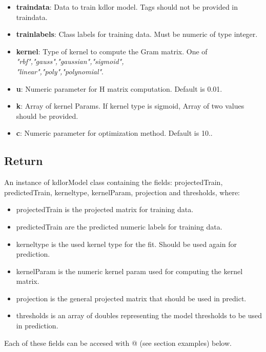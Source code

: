 \hline
\vspace{5pt}
\begin{itemize}
	\item \textbf{traindata}: Data to train kdlor model. Tags should not be provided in traindata.
	
	\item \textbf{trainlabels}: Class labels for training data. Must be numeric of type integer.
	
	\item \textbf{kernel}: Type of kernel to compute the Gram matrix. One of \textit{"rbf","gauss","gaussian","sigmoid", \\"linear","poly","polynomial"}.
	
	\item \textbf{u}: Numeric parameter for H matrix computation. Default is 0.01.
	
	\item \textbf{k}: Array of kernel Params. If kernel type is sigmoid, Array of two values should be provided.
	
	\item \textbf{c}: Numeric parameter for optimization method. Default is 10..
	
	\vspace{5pt}
	\hline
\end{itemize}

\subsection{Return}
An instance of kdlorModel class containing the fields: projectedTrain, predictedTrain, kerneltype, kernelParam, projection and thresholds, where: \newline
\begin{itemize}
	\item projectedTrain is the projected matrix for training data. 
	\item predictedTrain are the predicted numeric labels for training data. 
	\item kerneltype is the used kernel type for the fit. Should be used again for prediction.
	\item kernelParam is the numeric kernel param used for computing the kernel matrix.
	\item projection is the general projected matrix that should be used in predict.
	\item thresholds is an array of doubles representing the model thresholds to be used in prediction.
\end{itemize}
Each of these fields can be accesed with @ (see section examples) below.
